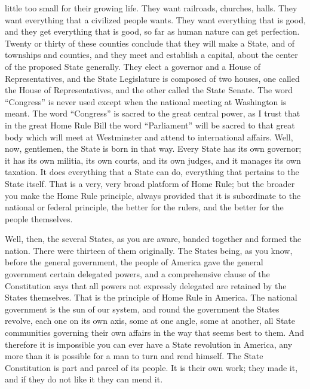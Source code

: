 \documentclass[11pt,openany]{book}
\begin{document}
little too small for their growing life. They want railroads, churches, halls. They want everything that a civilized people wants. They want everything that is good, and they get everything that is good, so far as human nature can get perfection. Twenty or thirty of these counties conclude that they will make a State, and of townships and counties, and they meet and establish a capital, about the center of the proposed State generally. They elect a governor and a House of Representatives, and the State Legislature is composed of two houses, one called the House of Representatives, and the other called the State Senate. The word ``Congress'' is never used except when the national meeting at Washington is meant. The word ``Congress'' is sacred to the great central power, as I trust that in the great Home Rule Bill the word ``Parliament'' will be sacred to that great body which will meet at Westminster and attend to international affairs. Well, now, gentlemen, the State is born in that way. Every State has its own governor; it has its own militia, its own courts, and its own judges, and it manages its own taxation. It does everything that a State can do, everything that pertains to the State itself. That is a very, very broad platform of Home Rule; but the broader you make the Home Rule principle, always provided that it is subordinate to the national or federal principle, the better for the rulers, and the better for the people themselves.

Well, then, the several States, as you are aware, banded together and formed the nation. There were thirteen of them originally. The States being, as you know, before the general government, the people of America gave the general government certain delegated powers, and a comprehensive clause of the Constitution says that all powers not expressly delegated are retained by the States themselves. That is the principle of Home Rule in America. The national government is the sun of our system, and round the government the States revolve, each one on its own axis, some at one angle, some at another, all State communities governing their own affairs in the way that seems best to them. And therefore it is impossible you can ever have a State revolution in America, any more than it is possible for a man to turn and rend himself. The State Constitution is part and parcel of its people. It is their own work; they made it, and if they do not like it they can mend it.
\end{document}
